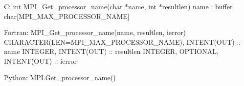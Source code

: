 C:
int MPI_Get_processor_name(char *name, int *resultlen)
name : buffer char[MPI_MAX_PROCESSOR_NAME]

Fortran:
MPI_Get_processor_name(name, resultlen, ierror)
CHARACTER(LEN=MPI_MAX_PROCESSOR_NAME), INTENT(OUT) :: name
INTEGER, INTENT(OUT) :: resultlen
INTEGER, OPTIONAL, INTENT(OUT) :: ierror 

Python:
MPI.Get_processor_name()
